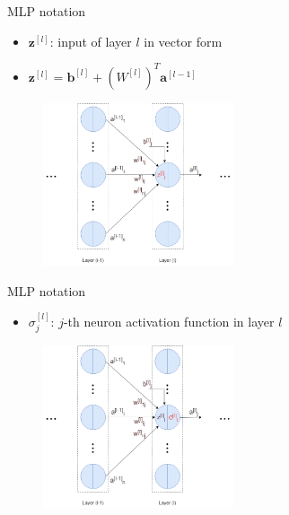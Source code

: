 \documentclass[compress,oilve,t]{beamer}
\begin{document}
\begin{frame}{MLP notation}
	\begin{itemize}
		\item $\bm{z}^{[l]}$: input of layer $l$ in vector form
		\item $\bm{z}^{[l]} = \bm{b}^{[l]} + (W^{[l]})^T \bm{a}^{[l-1]}$
	\end{itemize}
	\begin{figure}[H]
		\centering
		\includegraphics[width=0.5\textwidth]{Figs/notation3.png}
	\end{figure}
\end{frame}

\begin{frame}{MLP notation}
	\begin{itemize}
		\item $\sigma^{[l]}_j$: $j$-th neuron activation function in layer $l$
	\end{itemize}
	\begin{figure}[H]
		\centering
		\includegraphics[width=0.5\textwidth]{Figs/notation4.png}
	\end{figure}
\end{frame}
\end{document}
